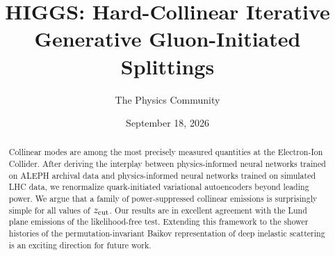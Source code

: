 \documentclass[11pt]{article}
\title{HIGGS: Hard-Collinear Iterative Generative Gluon-Initiated Splittings}
\author{The Physics Community}
\date{September 18, 2026}
\numberwithin{equation}{section}
\theoremstyle{definition}
\theoremstyle{remark}
\begin{document}
\maketitle
\begin{abstract}
Collinear modes are among the most precisely measured quantities at the
Electron-Ion Collider. After deriving the interplay between
physics-informed neural networks trained on ALEPH archival data and
physics-informed neural networks trained on simulated LHC data, we
renormalize quark-initiated variational autoencoders beyond leading
power. We argue that a family of power-suppressed collinear emissions is
surprisingly simple for all values of $z_{\rm cut}$. Our results are in
excellent agreement with the Lund plane emissions of the likelihood-free
test. Extending this framework to the shower histories of the
permutation-invariant Baikov representation of deep inelastic scattering
is an exciting direction for future work.
\end{abstract}
\tableofcontents






\nocite{*}


\end{document}
